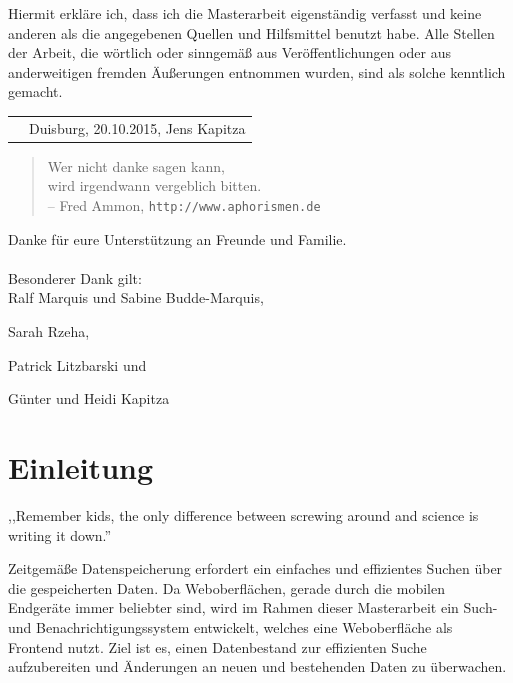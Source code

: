 \documentclass[oneside, ngerman, toc=bibliography,bibliography=totoc,listof=entryprefix, open=right,numbers=noenddot,fontsize=12pt]{scrbook}
\newcommand{\autor}{Jens Kapitza}
\newcommand{\ort}{Duisburg}
\newcommand{\einreichung}{20.10.2015}
\newcommand\chapmd[2]{\begin{mdframed}[%
		rightline=false,leftline=false,topline=false,bottomline=false,frametitlerule=false,
		userdefinedwidth=\textwidth,frametitlealignment=\flushright, %
		frametitlerulecolor=black,frametitle={\small #1}]
		\flushright{} \footnotesize{} #2
	\end{mdframed}}
\begin{document}
\vspace*{\fill}

\noindent Hiermit erkläre ich, dass ich die Masterarbeit eigenständig verfasst und keine anderen
als die angegebenen Quellen und Hilfsmittel benutzt habe.
Alle Stellen der Arbeit, die wörtlich oder sinngemäß aus \mbox{Veröffentlichungen} oder aus anderweitigen
fremden Äußerungen entnommen wurden, sind als solche kenntlich gemacht.

\vspace{30mm}


\begin{tabularx}{\linewidth}{Xr}\cline{2-2}
& \ort{}, \einreichung{}, \autor{}
\end{tabularx}


\cleardoublepage
\vspace*{3cm}
\begin{quote}\Large
\centering
    Wer nicht danke sagen kann,\\wird irgendwann vergeblich bitten.\\
    {\small -- Fred Ammon,  \verb|http://www.aphorismen.de| }
\end{quote}
\vspace*{3cm}
\noindent
Danke für eure Unterstützung an Freunde und Familie. \\ \bigskip \\
Besonderer Dank gilt: \\

Ralf Marquis und Sabine Budde-Marquis,

Sarah Rzeha,

Patrick Litzbarski und 

Günter und Heidi Kapitza

\pagebreak


\tableofcontents{}

\mainmatter{}


\chapter{Einleitung}
\label{chap:einleitung}
\chapmd{Facebookseite der MythBusters (26.09.2013)}{,,Remember kids, the only difference between screwing around and science is writing it down.''}

Zeitgemäße Datenspeicherung erfordert ein einfaches und effizientes Suchen über die gespeicherten Daten. Da Weboberflächen, gerade durch die mobilen Endgeräte immer beliebter sind, wird im Rahmen dieser Masterarbeit ein Such- und Benachrichtigungssystem entwickelt, welches eine Weboberfläche als Frontend nutzt. Ziel ist es, einen Datenbestand zur effizienten Suche aufzubereiten und Änderungen an neuen und bestehenden Daten zu überwachen.
\end{document}
